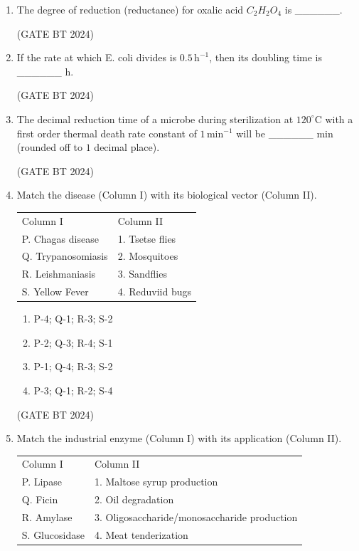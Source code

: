 \documentclass[journal,12pt,onecolumn]{IEEEtran}
\theoremstyle{remark}
\begin{document}
\begin{enumerate}
\item 
The degree of reduction (reductance) for oxalic acid $C_2H_2O_4$ is \_\_\_\_\_\_.

\hfill(GATE BT 2024)

\item 
If the rate at which E. coli divides is $0.5\,\text{h}^{-1}$, then its doubling time is \_\_\_\_\_\_ h.

\hfill(GATE BT 2024)

\item 
The decimal reduction time of a microbe during sterilization at $120^\circ\text{C}$ with a first order thermal death rate constant of $1\,\text{min}^{-1}$ will be \_\_\_\_\_\_ min (rounded off to $1$ decimal place).

\hfill(GATE BT 2024)

\item 
Match the disease (Column I) with its biological vector (Column II).

\begin{tabular}{ll}
Column I & Column II \\
P. Chagas disease & 1. Tsetse flies \\
Q. Trypanosomiasis & 2. Mosquitoes \\
R. Leishmaniasis & 3. Sandflies \\
S. Yellow Fever & 4. Reduviid bugs \\
\end{tabular}

\begin{enumerate}
    \item P-4; Q-1; R-3; S-2
    \item P-2; Q-3; R-4; S-1
    \item P-1; Q-4; R-3; S-2
    \item P-3; Q-1; R-2; S-4
\end{enumerate}
\hfill(GATE BT 2024)

\item Match the industrial enzyme (Column I) with its application (Column II).

\begin{tabular}{ll}
Column I & Column II \\
P. Lipase & 1. Maltose syrup production \\
Q. Ficin & 2. Oil degradation \\
R. Amylase & 3. Oligosaccharide/monosaccharide production \\
S. Glucosidase & 4. Meat tenderization \\
\end{tabular}


\end{enumerate}
\end{document}
